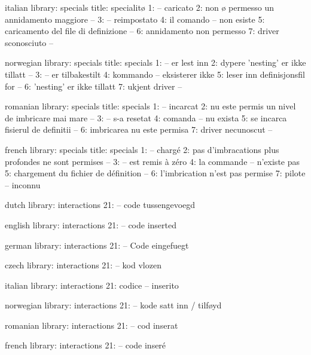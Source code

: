 \startmessages  italian  library: specials
  title: specialitø
      1: -- caricato
      2: non ø permesso un annidamento maggiore --
      3: -- reimpostato
      4: il comando -- non esiste
      5: caricamento del file di definizione --
      6: annidamento non permesso
      7: driver sconosciuto --
\stopmessages

\startmessages  norwegian  library: specials
  title: specials
      1: -- er lest inn
      2: dypere 'nesting' er ikke tillatt --
      3: -- er tilbakestilt
      4: kommando -- eksisterer ikke
      5: leser inn definisjonsfil for --
      6: 'nesting' er ikke tillatt
      7: ukjent driver --
\stopmessages

\startmessages  romanian  library: specials
  title: specials
      1: -- incarcat
      2: nu este permis un nivel de imbricare mai mare --
      3: -- s-a resetat
      4: comanda -- nu exista
      5: se incarca fisierul de definitii --
      6: imbricarea nu este permisa
      7: driver necunoscut --
\stopmessages

\startmessages  french  library: specials
  title: specials
      1: -- chargé
      2: pas d'imbracations plus profondes ne sont permises --
      3: -- est remis à zéro
      4: la commande -- n'existe pas
      5: chargement du fichier de définition --
      6: l'imbrication n'est pas permise
      7: pilote -- inconnu
\stopmessages

\startmessages  dutch  library: interactions
     21: -- code tussengevoegd
\stopmessages

\startmessages  english  library: interactions
     21: -- code inserted
\stopmessages

\startmessages  german  library: interactions
     21: -- Code eingefuegt
\stopmessages

\startmessages  czech  library: interactions
     21: -- kod vlozen
\stopmessages

\startmessages  italian  library: interactions
     21: codice -- inserito
\stopmessages

\startmessages  norwegian  library: interactions
     21: -- kode satt inn / tilføyd
\stopmessages

\startmessages  romanian  library: interactions
     21: -- cod inserat
\stopmessages

\startmessages  french  library: interactions
     21: -- code inseré
\stopmessages


